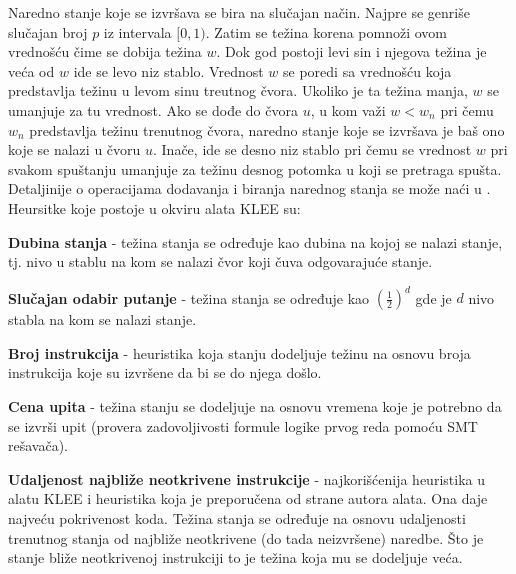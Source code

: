 \documentclass[12pt,oneside]{memoir}
\begin{document}
Naredno stanje koje se izvršava se bira na slučajan način. Najpre se genriše slučajan broj $p$ iz intervala $[0, 1)$. Zatim se težina korena pomnoži ovom vrednošću čime se dobija težina $w$. Dok god postoji levi sin i njegova težina je veća od $w$ ide se levo niz stablo. Vrednost $w$ se poredi sa vrednošću koja predstavlja težinu u levom sinu treutnog čvora. Ukoliko je ta težina manja, $w$ se umanjuje za tu vrednost. Ako se dođe do čvora $u$, u kom važi $w < w_n$ pri čemu $w_n$ predstavlja težinu trenutnog čvora, naredno stanje koje se izvršava je baš ono koje se nalazi u čvoru $u$. Inače, ide se desno niz stablo pri čemu se vrednost $w$ pri svakom spuštanju umanjuje za težinu desnog potomka u koji se pretraga spušta. Detaljinije o operacijama dodavanja i biranja narednog stanja se može naći u \cite{klee}. Heursitke koje postoje u okviru alata KLEE su:
\begin{description}
    \item\textbf{Dubina stanja} - težina stanja se određuje kao dubina na kojoj se nalazi stanje, tj. nivo u stablu na kom se nalazi čvor koji čuva odgovarajuće stanje.
    
    \item\textbf{Slučajan odabir putanje} - težina stanja se određuje kao $(\frac{1}{2}) ^ d$ gde je $d$ nivo stabla na kom se nalazi stanje.
    
    \item\textbf{Broj instrukcija} - heuristika koja stanju dodeljuje težinu na osnovu broja instrukcija koje su izvršene da bi se do njega došlo.
    
    \item\textbf{Cena upita} - težina stanju se dodeljuje na osnovu vremena koje je potrebno da se izvrši upit (provera zadovoljivosti formule logike prvog reda pomoću SMT rešavača).
    
    \item\textbf{Udaljenost najbliže neotkrivene instrukcije} - najkorišćenija heuristika u alatu KLEE i heuristika koja je preporučena od strane autora alata. Ona daje najveću pokrivenost koda. Težina stanja se određuje na osnovu udaljenosti trenutnog stanja od najbliže neotkrivene (do tada neizvršene) naredbe. Što je stanje bliže neotkrivenoj instrukciji to je težina koja mu se dodeljuje veća. 
\end{description}

\bigskip
\end{document}
